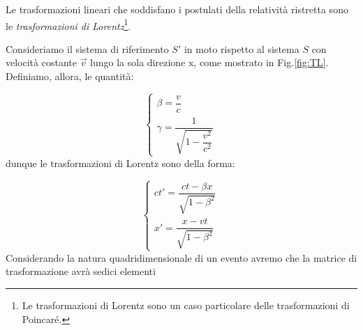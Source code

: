 Le trasformazioni lineari che soddisfano i postulati della relatività ristretta sono le \textit{trasformazioni di Lorentz}\footnote{Le trasformazioni di Lorentz sono un caso particolare delle trasformazioni di Poincaré.}.

Consideriamo il sistema di riferimento $S'$ in moto rispetto al sistema $S$ con velocità costante $\Vec{v}$ lungo la sola direzione x, come mostrato in Fig.\ref{fig:TL}. 
\newpage
Definiamo, allora, le quantità:

\begin{equation}
    \begin{cases}
      \beta=\dfrac{v}{c}
             \\
     \gamma = \dfrac{1}{\sqrt{1-\dfrac{v^{2}}{c^{2}}}}
    \end{cases}\,
\end{equation}
dunque le trasformazioni di Lorentz sono della forma:

\begin{equation}
    \begin{cases}
      ct'=\dfrac{ct-\beta x}{\sqrt{1-\beta^2}}
             \\
     x' = \dfrac{x-vt}{\sqrt{1-\beta^2}}
    \end{cases}\,
\end{equation}
Considerando la natura quadridimensionale di un evento avremo che la matrice di trasformazione avrà sedici elementi

